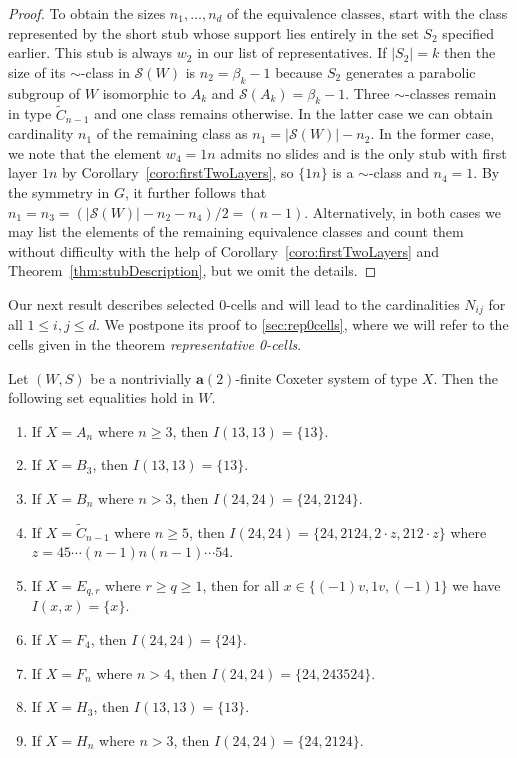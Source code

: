 \documentclass[ALCO,Unicode,published]{cedram}
\newcommand{\cals}{\mathcal{S}}
\newcommand{\la}{\mathbf{a}}
\newcommand{\sw}{\mathcal{S}(W)}
\newcommand{\ntatf}{nontrivially $\la(2)$-finite }
\newcommand{\abs}[1]{\lvert #1 \rvert}
\begin{document}
\begin{proof}
To obtain the sizes $n_1,\dots, n_d$ of the equivalence classes, start with the class represented by
the short stub whose support lies entirely in the set $S_2$ specified earlier. This stub is always
$w_2$ in our list of representatives. If $\abs{S_2}=k$ then the size of its $\sim$-class in $\sw$ is
$n_2=\beta_{k}-1$ because $S_2$ generates a parabolic subgroup of $W$ isomorphic to $A_{k}$ and
$\cals(A_k)=\beta_{k}-1$. Three $\sim$-classes remain in type $\tilde C_{n-1}$ and one class remains
otherwise. In the latter case we can obtain cardinality $n_1$ of the remaining class as
$n_1=\abs{\sw}-n_2$. In the former case, we note that the element $w_4=1n$ admits no slides and is
the only stub with first layer $1n$ by Corollary~\ref{coro:firstTwoLayers}, so $\{1n\}$ is a $\sim$-class and
$n_4=1$. By the symmetry in $G$, it further follows that $n_1=n_3=(\abs{\sw}-n_2-n_4)/2=(n-1)$.
Alternatively, in both cases we may list the elements of the remaining equivalence classes and count
them without difficulty with the help of Corollary~\ref{coro:firstTwoLayers} and Theorem~\ref{thm:stubDescription},
but we omit the details.  
\end{proof}

Our next result describes selected 0-cells and will lead to the cardinalities $N_{ij}$ for all $1\le
i,j\le d$. We postpone its proof to \autoref{sec:rep0cells}, where we will refer to the cells given in
the theorem \emph{representative 0-cells}.

\begin{thm}
    \label{thm:oneI}
   Let $(W,S)$ be a \ntatf Coxeter system of type $X$. Then the following set equalities hold in $W$. 
    \begin{enumerate}
        \item If $X=A_n$ where $n\ge 3$, then $I(13,13)=\{13\}$.
        \item If $X=B_3$, then $I(13,13)=\{13\}$. 
        \item If $X=B_n$ where $n>3$, then $I(24,24)=\{24,2124\}$.
        \item If $X=\tilde C_{n-1}$ where $n\ge 5$, then $I(24,24)=\{24, 2124, 2\cdot z, 212\cdot z\}$ where
             $z=45\cdots (n-1)n(n-1)\cdots54$.
         \item If $X=E_{q,r}$ where $r\ge q\ge 1$, then for all $x\in \{(-1)v,1v,(-1)1\}$ we have $I(x,x)=\{x\}$. 
        \item If $X=F_4$, then $I(24,24)=\{24\}$. 
        \item If $X=F_n$ where $n>4$, then $I(24,24)=\{24,243524\}$. 
        \item If $X=H_3$, then $I(13,13)=\{13\}$. 
        \item If $X=H_n$ where $n>3$, then $I(24,24)=\{24,2124\}$. 
    \end{enumerate}
\end{thm}
\end{document}
